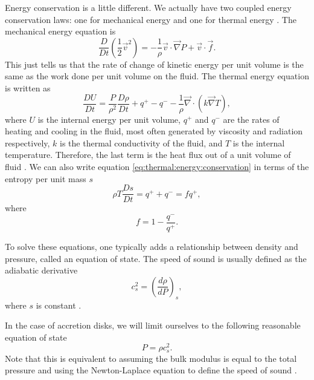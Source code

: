 \documentclass[]{article}
\newcommand{\myvec}[1]{\vec{#1}} %
\newcommand{\diff}[2]{\frac{d #1}{d #2}}
\newcommand{\Dt}[1]{\frac{D #1}{Dt}}
\newcommand{\DDt}{\frac{D}{Dt}}
\begin{document}
Energy conservation is a little different. We actually have two
coupled energy conservation laws: one for mechanical energy and one
for thermal energy \cite{Melia,Thompson}. The mechanical energy
equation is \cite{Thompson}
\begin{equation}
  \label{eq:mechanical:energy}
  \DDt\left(\frac{1}{2}\myvec{v}^2\right) = - \frac{1}{\rho}\myvec{v}\cdot\myvec{\nabla} P + \myvec{v}\cdot\myvec{f}.
\end{equation}
This just tells us that the rate of change of kinetic energy per unit
volume is the same as the work done per unit volume on the fluid. The
thermal energy equation is written as
\begin{equation}
  \label{eq:thermal:energy:conservation}
  \Dt{U} = \frac{P}{\rho^2} \Dt{\rho} + q^+ - q^- - \frac{1}{\rho}\myvec{\nabla}\cdot (k\myvec{\nabla}T),
\end{equation}
where $U$ is the internal energy per unit volume, $q^+$ and $q^-$ are
the rates of heating and cooling in the fluid, most often generated by
viscosity and radiation respectively, $k$ is the thermal conductivity
of the fluid, and $T$ is the internal temperature. Therefore, the last
term is the heat flux out of a unit volume of fluid \cite{Thompson,WikiFluids}. We can also write equation \eqref{eq:thermal:energy:conservation} in
terms of the entropy per unit mass $s$ \cite{Shafee08}
\begin{equation}
  \label{eq:entropy:conservation}
  \rho T \Dt{s} = q^+ + q^- = f q^+,
\end{equation}
where 
\begin{equation}
  \label{eq:def:f}
  f = 1 - \frac{q^-}{q^+}.
\end{equation}

To solve these equations, one typically adds a relationship between
density and pressure, called an equation of state. The speed of sound
is usually defined as the adiabatic derivative
\begin{equation}
  \label{eq:def:sound:speed}
  c_s^2 = \left(\diff{\rho}{P}\right)_s,
\end{equation}
where $s$ is constant \cite{Thompson,WikipediaSpeedOfSound}.

In the case of accretion disks, we will limit ourselves to the
following reasonable equation of state \cite{Shafee08,Frank,Melia}
\begin{equation}
  \label{eq:p:rho:relation}
  P = \rho c_s^2.
\end{equation}
Note that this is equivalent to assuming the bulk modulus is equal to
the total pressure and using the Newton-Laplace equation to define the
speed of sound \cite{WikipediaSpeedOfSound}.
\end{document}
